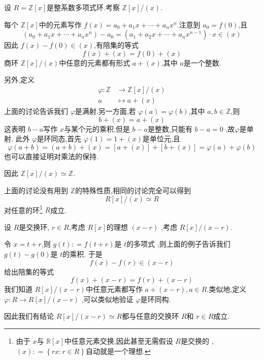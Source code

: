 \documentclass[lang=cn,12pt,color=green,fontset=none,pad]{elegantbook}
\begin{document}
\begin{example}
    设 $ R = \mathbb{Z} [x] $是整系数多项式环.考察 $ \mathbb{Z} [x]/\left( x \right)  $.
    
    每个 $ \mathbb{Z} [x] $中的元素写作 $ f\left( x \right)   = a_0+ a_1x+ \cdots + a_{n}x^{n}$.注意到 $ a_0 = f\left( 0 \right)  $,且 $$
    \left( a_0+ a_1x+ \cdots + a_{n}x^{n} \right)-a_0= \left( a_1+ a_2x+ \cdots + a_{n}x^{n-1} \right)\cdot x \in \left( x \right)   
    $$ 因此 $ f\left( x \right)-f\left( 0 \right) \in \left( x \right)    $,有陪集的等式 $$
    f\left( x \right)+ \left( x \right) = f\left( 0 \right)+ \left( x \right)    
    $$ 商环 $ \mathbb{Z} [x]/\left( x \right)  $中任意的元素都有形式 $ a+ \left( x \right)  $,其中 $ a $是一个整数.
    
    另外,定义 $$
   \begin{aligned}
    \varphi :\mathbb{Z} &\to \mathbb{Z} [x]/\left( x \right) \\ 
     a& \mapsto a+ \left( x \right)  
   \end{aligned}
    $$上面的讨论告诉我们 $ \varphi  $是满射.另一方面,若 $ \varphi \left( a \right)=\varphi \left( b \right)   $,其中 $ a,b \in \mathbb{Z}  $,则 $$
    b+ \left( x \right)=a+ \left( x \right)  
    $$  这表明 $ b-a $写作 $ x $与某个元的乘积,但是 $ b-a $是整数,只能有 $ b-a =0 $   ,故$ \varphi  $是单射.   
    此外 $ \varphi  $是环同态,首先 $ \varphi \left( 1 \right)=1+ \left( x \right)   $是单位元,且 $$
    \varphi \left( a+ b \right)=\left( a+ b \right)+ \left( x \right)= [a+ \left( x \right) ]+ [b+ \left( x \right) ]    =\varphi \left( a \right)+ \varphi \left( b \right)  
    $$  也可以直接证明对乘法的保持.

    因此 $ \mathbb{Z} [x]/\left( x \right) \simeq \mathbb{Z}   $.
    
    上面的讨论没有用到 $ \mathbb{Z}  $的特殊性质,相同的讨论完全可以得到 $$
    R[x]/ \left( x \right)\simeq R 
    $$对任意的环\footnote{由于 $ x $与 $ \mathbb{R} [x] $中任意元素交换,因此甚至无需假设 $ R $是交换的 , $ \left( x \right): = \left\{ rx:r \in R \right\}  $自动就是一个理想.   } $ R $成立.  
\end{example}

\begin{example}
    设 $ R $是交换环, $ r \in R $,考虑 $ R[x] $的理想 $ \left( x-r \right)  $   ,考虑 $ R[x]/\left( x-r \right)  $.
    
    令 $ x = t+ r $,则  $ g\left( t \right): = f\left( t+ r \right)   $是 $ t $的多项式 ,则上面的例子告诉我们 $  g\left( t \right)-g\left( 0 \right)  $是 $ t $的乘积.   于是 $$
    f\left( x \right)-f\left( r \right) \in \left( x-r \right)   
    $$给出陪集的等式 $$
    f\left( x \right)+ \left( x-r \right)= f\left( r \right)+ \left( x-r \right)    
    $$我们知道 $ R[x]/\left( x-r \right)  $中任意元素都写作 $ a+ \left( x-r \right)  ,a \in R$.类似地,定义 $ \varphi : R\to R[x]/\left( x-r \right)  $   ,可以类似地验证 $ \varphi  $是环同构. 

    因此我们有结论 $ R[x] /\left( x-r \right)\simeq R  $都与任意的交换环 $ R $和 $ r \in R $成立.   
\end{example}
\end{document}
